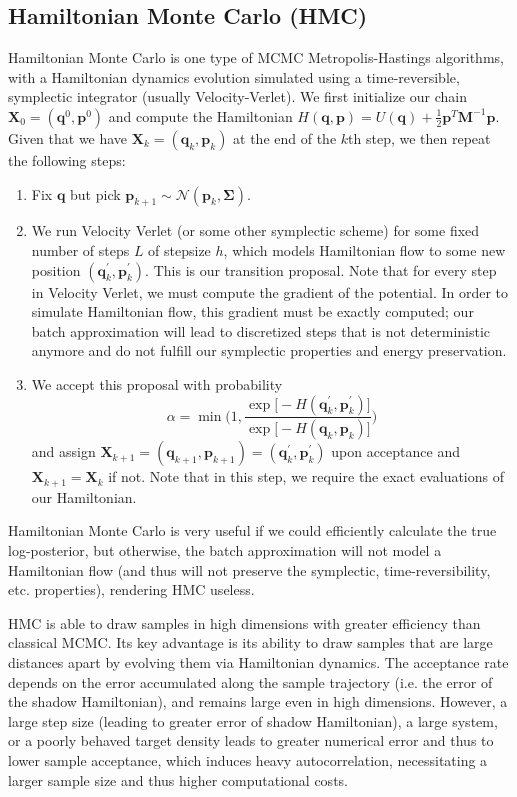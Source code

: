 \documentclass{article}
\theoremstyle{remark}
\theoremstyle{definition}
\begin{document}
\subsection{Hamiltonian Monte Carlo (HMC)}
Hamiltonian Monte Carlo is one type of MCMC Metropolis-Hastings algorithms, with a Hamiltonian dynamics evolution simulated using a time-reversible, symplectic integrator (usually Velocity-Verlet). We first initialize our chain $\mathbf{X}_0 = (\mathbf{q}^0, \mathbf{p}^0)$ and compute the Hamiltonian $H(\mathbf{q}, \mathbf{p}) = U(\mathbf{q}) + \frac{1}{2} \mathbf{p}^T \mathbf{M}^{-1} \mathbf{p}$. Given that we have $\mathbf{X}_k = (\mathbf{q}_k, \mathbf{p}_k)$ at the end of the $k$th step, we then repeat the following steps: 
\begin{enumerate}
    \item Fix $\mathbf{q}$ but pick $\mathbf{p}_{k+1} \sim \mathcal{N}(\mathbf{p}_k, \mathbf{\Sigma})$. 
    \item We run Velocity Verlet (or some other symplectic scheme) for some fixed number of steps $L$ of stepsize $h$, which models Hamiltonian flow to some new position $(\mathbf{q}_k^\prime, \mathbf{p}_k^\prime)$. This is our transition proposal. Note that for every step in Velocity Verlet, we must compute the gradient of the potential. In order to simulate Hamiltonian flow, this gradient must be exactly computed; our batch approximation will lead to discretized steps that is not deterministic anymore and do not fulfill our symplectic properties and energy preservation. 
    \item We accept this proposal with probability 
    \[\alpha = \min \bigg( 1, \frac{\exp \big[ -H(\mathbf{q}_k^\prime, \mathbf{p}_k^\prime) \big]}{\exp \big[ -H(\mathbf{q}_k, \mathbf{p}_k)\big]} \bigg)\]
    and assign $\mathbf{X}_{k+1} = (\mathbf{q}_{k+1}, \mathbf{p}_{k+1}) = (\mathbf{q}_k^\prime, \mathbf{p}_k^\prime)$ upon acceptance and $\mathbf{X}_{k+1} = \mathbf{X}_k$ if not. Note that in this step, we require the exact evaluations of our Hamiltonian. 
\end{enumerate}
Hamiltonian Monte Carlo is very useful if we could efficiently calculate the true log-posterior, but otherwise, the batch approximation will not model a Hamiltonian flow (and thus will not preserve the symplectic, time-reversibility, etc. properties), rendering HMC useless. 

HMC is able to draw samples in high dimensions with greater efficiency than classical MCMC. Its key advantage is its ability to draw samples that are large distances apart by evolving them via Hamiltonian dynamics. The acceptance rate depends on the error accumulated along the sample trajectory (i.e. the error of the shadow Hamiltonian), and remains large even in high dimensions. However, a large step size (leading to greater error of shadow Hamiltonian), a large system, or a poorly behaved target density leads to greater numerical error and thus to lower sample acceptance, which induces heavy autocorrelation, necessitating a larger sample size and thus higher computational costs. 
\end{document}
